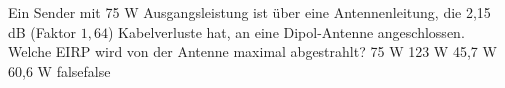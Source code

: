     {Ein Sender mit 75 W Ausgangsleistung ist über eine Antennenleitung, die 2,15 dB (Faktor $1,64$) Kabelverluste hat, an eine Dipol-Antenne angeschlossen. Welche EIRP wird von der Antenne maximal abgestrahlt?}
    {75 W}
    {123 W}
    {45,7 W}
    {60,6 W}
    {false}{false}